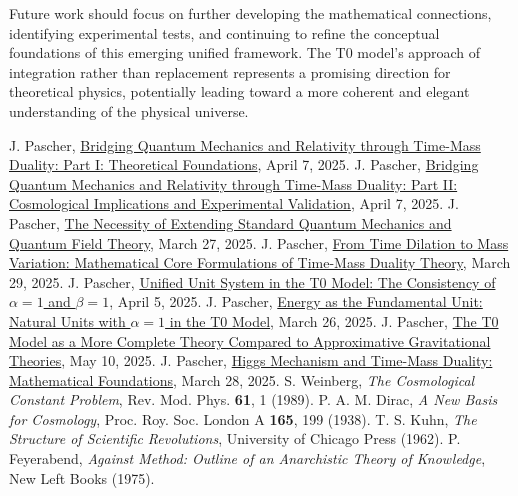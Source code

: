 \documentclass[12pt,a4paper]{article}
\begin{document}
	Future work should focus on further developing the mathematical connections, identifying experimental tests, and continuing to refine the conceptual foundations of this emerging unified framework. The T0 model's approach of integration rather than replacement represents a promising direction for theoretical physics, potentially leading toward a more coherent and elegant understanding of the physical universe.
	
	\begin{thebibliography}{99}
		 J. Pascher, \href{https://github.com/jpascher/T0-Time-Mass-Duality/tree/main/2/pdf/English/QMRelTimeMassPart1En.pdf}{Bridging Quantum Mechanics and Relativity through Time-Mass Duality: Part I: Theoretical Foundations}, April 7, 2025.
		 J. Pascher, \href{https://github.com/jpascher/T0-Time-Mass-Duality/tree/main/2/pdf/English/QMRelTimeMassPart2En.pdf}{Bridging Quantum Mechanics and Relativity through Time-Mass Duality: Part II: Cosmological Implications and Experimental Validation}, April 7, 2025.
		 J. Pascher, \href{https://github.com/jpascher/T0-Time-Mass-Duality/tree/main/2/pdf/English/NotwendigkeitQMErweiterungEn.pdf}{The Necessity of Extending Standard Quantum Mechanics and Quantum Field Theory}, March 27, 2025.
		 J. Pascher, \href{https://github.com/jpascher/T0-Time-Mass-Duality/tree/main/2/pdf/English/MathZeitMasseLagrangeEn.pdf}{From Time Dilation to Mass Variation: Mathematical Core Formulations of Time-Mass Duality Theory}, March 29, 2025.
		 J. Pascher, \href{https://github.com/jpascher/T0-Time-Mass-Duality/tree/main/2/pdf/English/Alpha1Beta1KonsistenzEn.pdf}{Unified Unit System in the T0 Model: The Consistency of $\alpha = 1$ and $\beta = 1$}, April 5, 2025.
		 J. Pascher, \href{https://github.com/jpascher/T0-Time-Mass-Duality/tree/main/2/pdf/English/NatEinheitenAlpha1En.pdf}{Energy as the Fundamental Unit: Natural Units with $\alpha = 1$ in the T0 Model}, March 26, 2025.
		 J. Pascher, \href{https://github.com/jpascher/T0-Time-Mass-Duality/tree/main/2/pdf/English/T0-ModelAsCompleteTheory_En.pdf}{The T0 Model as a More Complete Theory Compared to Approximative Gravitational Theories}, May 10, 2025.
		 J. Pascher, \href{https://github.com/jpascher/T0-Time-Mass-Duality/tree/main/2/pdf/English/MathHiggsZeitMasseEn.pdf}{Higgs Mechanism and Time-Mass Duality: Mathematical Foundations}, March 28, 2025.
		 S. Weinberg, \textit{The Cosmological Constant Problem}, Rev. Mod. Phys. \textbf{61}, 1 (1989).
		 P. A. M. Dirac, \textit{A New Basis for Cosmology}, Proc. Roy. Soc. London A \textbf{165}, 199 (1938).
		 T. S. Kuhn, \textit{The Structure of Scientific Revolutions}, University of Chicago Press (1962).
		 P. Feyerabend, \textit{Against Method: Outline of an Anarchistic Theory of Knowledge}, New Left Books (1975).
	\end{thebibliography}
	
\end{document}
